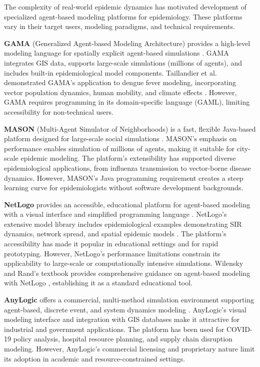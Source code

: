 The complexity of real-world epidemic dynamics has motivated development of specialized agent-based modeling platforms for epidemiology. These platforms vary in their target users, modeling paradigms, and technical requirements.

\textbf{GAMA} (Generalized Agent-based Modeling Architecture) provides a high-level modeling language for spatially explicit agent-based simulations \cite{grignard2013gama}. GAMA integrates GIS data, supports large-scale simulations (millions of agents), and includes built-in epidemiological model components. Taillandier et al. demonstrated GAMA's application to dengue fever modeling, incorporating vector population dynamics, human mobility, and climate effects \cite{taillandier2014dengue}. However, GAMA requires programming in its domain-specific language (GAML), limiting accessibility for non-technical users.

\textbf{MASON} (Multi-Agent Simulator of Neighborhoods) is a fast, flexible Java-based platform designed for large-scale social simulations \cite{luke2005mason}. MASON's emphasis on performance enables simulation of millions of agents, making it suitable for city-scale epidemic modeling. The platform's extensibility has supported diverse epidemiological applications, from influenza transmission to vector-borne disease dynamics. However, MASON's Java programming requirement creates a steep learning curve for epidemiologists without software development backgrounds.

\textbf{NetLogo} provides an accessible, educational platform for agent-based modeling with a visual interface and simplified programming language \cite{wilensky1999netlogo}. NetLogo's extensive model library includes epidemiological examples demonstrating SIR dynamics, network spread, and spatial epidemic models \cite{edgecombe2013epidemiological}. The platform's accessibility has made it popular in educational settings and for rapid prototyping. However, NetLogo's performance limitations constrain its applicability to large-scale or computationally intensive simulations. Wilensky and Rand's textbook provides comprehensive guidance on agent-based modeling with NetLogo \cite{wilensky2014agent}, establishing it as a standard educational tool.

\textbf{AnyLogic} offers a commercial, multi-method simulation environment supporting agent-based, discrete event, and system dynamics modeling \cite{borshchev2013anylogic}. AnyLogic's visual modeling interface and integration with GIS databases make it attractive for industrial and government applications. The platform has been used for COVID-19 policy analysis, hospital resource planning, and supply chain disruption modeling. However, AnyLogic's commercial licensing and proprietary nature limit its adoption in academic and resource-constrained settings.

